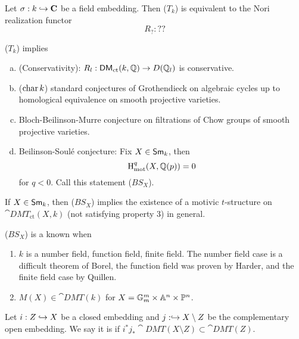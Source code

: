 \begin{proposition}
Let $\sigma:k\hookrightarrow \mathbf{C}$ be a field embedding. Then ($T_k$) is equivalent to the Nori
realization functor
\[
R_{?} : ??
\]
\end{proposition}
\begin{theorem}
($T_k$) implies
\begin{enumerate}[a)]
\item (Conservativity): $R_l:\cat{DM}_{\text{ct}}(k,\Q)\to D(\Q_l)$ is conservative.
\item ($\operatorname{char} k$) standard conjectures of Grothendieck on algebraic cycles up to
homological equivalence on smooth projective varieties.
\item Bloch-Beilinson-Murre conjecture on filtrations of Chow groups of smooth projective varieties.
\item Beilinson-Soul\'e conjecture: Fix $X\in \mathsf{Sm}_k$, then
\[
\mathrm{H}_{\text{mot}}^{q}(X,\mathbb Q(p)) = 0
\]
for $q<0$. Call this statement ($BS_X$).
\end{enumerate}
\end{theorem}
\begin{theorem}[Levine]
If $X\in \mathsf{Sm}_k$, then ($BS_X$) implies the existence of a motivic $t$-structure on
$\cat{DMT}_{\text{ct}}(X,k)$ (not satisfying property 3) in general.
\end{theorem}
\begin{theorem}
($BS_X$) is a known when
\begin{enumerate}[1)]
\item $k$ is a number field, function field, finite field. The number field case is a
difficult theorem of Borel, the function field was proven by Harder, and the finite field
case by Quillen.
\item $M(X)\in \cat{DMT}(k)$ for $X=\mathbb{G}_m^{m}\times \mathbb A^{n}\times \mathbb{P}^{n}$.
\end{enumerate}
\end{theorem}
\begin{definition}
Let $i:Z\hookrightarrow X$ be a closed embedding and $j:\hookrightarrow X\setminus Z$ be the complementary
open embedding. We say it is  if $i^{*}j_*\cat{DMT}(X\setminus
Z)\subset \cat{DMT}(Z)$.
\end{definition}



